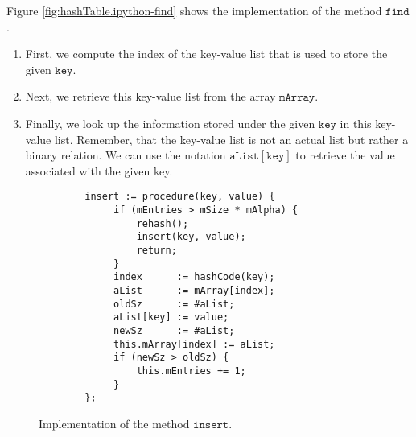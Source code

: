 Figure \ref{fig:hashTable.ipython-find} shows the implementation of the method $\texttt{find}$.
\begin{enumerate}
\item First, we compute the index of the key-value list that is used to store the given
      $\texttt{key}$.
\item Next, we retrieve this key-value list from the array $\texttt{mArray}$.
\item Finally, we look up the information stored under the given $\texttt{key}$ in this 
      key-value list.  Remember, that the key-value list is not an actual list but rather a binary
      relation.  We can use the notation $\texttt{aList}[\texttt{key}]$ to retrieve the value associated with
      the given key.
\end{enumerate}

\begin{figure}[!ht]
\centering
\begin{verbatim}
        insert := procedure(key, value) {
             if (mEntries > mSize * mAlpha) {
                 rehash();
                 insert(key, value);
                 return;
             }
             index      := hashCode(key);
             aList      := mArray[index];
             oldSz      := #aList;
             aList[key] := value;
             newSz      := #aList;
             this.mArray[index] := aList;
             if (newSz > oldSz) {
                 this.mEntries += 1;
             }    
        };
\end{verbatim}
\vspace*{-0.3cm}
\caption{Implementation of the method $\texttt{insert}$.}
\label{fig:hashTable.ipython-insert}
\end{figure}

